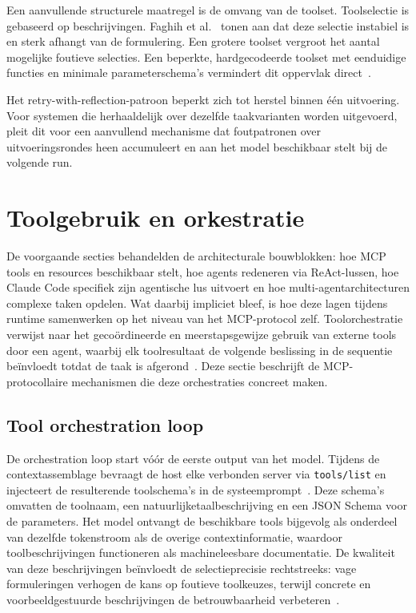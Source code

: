 Een aanvullende structurele maatregel is de omvang van de toolset. Toolselectie is gebaseerd op beschrijvingen. Faghih et al.~\cite{faghih2025toolpreferences} tonen aan dat deze selectie instabiel is en sterk afhangt van de formulering. Een grotere toolset vergroot het aantal mogelijke foutieve selecties. Een beperkte, hardgecodeerde toolset met eenduidige functies en minimale parameterschema's vermindert dit oppervlak direct~\cite{huang2026toolinvocation}.

Het retry-with-reflection-patroon beperkt zich tot herstel binnen één uitvoering. Voor systemen die herhaaldelijk over dezelfde taakvarianten worden uitgevoerd, pleit dit voor een aanvullend mechanisme dat foutpatronen over uitvoeringsrondes heen accumuleert en aan het model beschikbaar stelt bij de volgende run.

\section{Toolgebruik en orkestratie}\label{sec:tool-orchestration}

De voorgaande secties behandelden de architecturale bouwblokken: hoe MCP tools en resources beschikbaar stelt, hoe agents redeneren via ReAct-lussen, hoe Claude Code specifiek zijn agentische lus uitvoert en hoe multi-agentarchitecturen complexe taken opdelen. Wat daarbij impliciet bleef, is hoe deze lagen tijdens runtime samenwerken op het niveau van het MCP-protocol zelf. Toolorchestratie verwijst naar het gecoördineerde en meerstapsgewijze gebruik van externe tools door een agent, waarbij elk toolresultaat de volgende beslissing in de sequentie beïnvloedt totdat de taak is afgerond~\cite{wang2023agents}. Deze sectie beschrijft de MCP-protocollaire mechanismen die deze orchestraties concreet maken.

\subsection{Tool orchestration loop}\label{subsec:orchestration-loop}

De orchestration loop start vóór de eerste output van het model. Tijdens de contextassemblage bevraagt de host elke verbonden server via \texttt{tools/list} en injecteert de resulterende toolschema's in de systeemprompt~\cite{mcpspec2025tools}. Deze schema's omvatten de toolnaam, een natuurlijketaalbeschrijving en een JSON Schema voor de parameters. Het model ontvangt de beschikbare tools bijgevolg als onderdeel van dezelfde tokenstroom als de overige contextinformatie, waardoor toolbeschrijvingen functioneren als machineleesbare documentatie. De kwaliteit van deze beschrijvingen beïnvloedt de selectieprecisie rechtstreeks: vage formuleringen verhogen de kans op foutieve toolkeuzes, terwijl concrete en voorbeeldgestuurde beschrijvingen de betrouwbaarheid verbeteren~\cite{Fan2025MCPToolBenchPP}.

